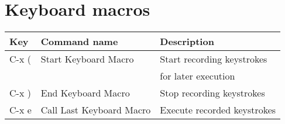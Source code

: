 \section{Keyboard macros}

\begin{tabular}{|l|l|l|}
\hline
Key          & Command name         & Description\\
\hline
C-x (        & Start Keyboard Macro & Start recording keystrokes \\
             &                      & for later execution \\
C-x )        & End Keyboard Macro   & Stop recording keystrokes \\
C-x e        & Call Last Keyboard Macro & Execute recorded keystrokes \\
\hline
\end{tabular}

